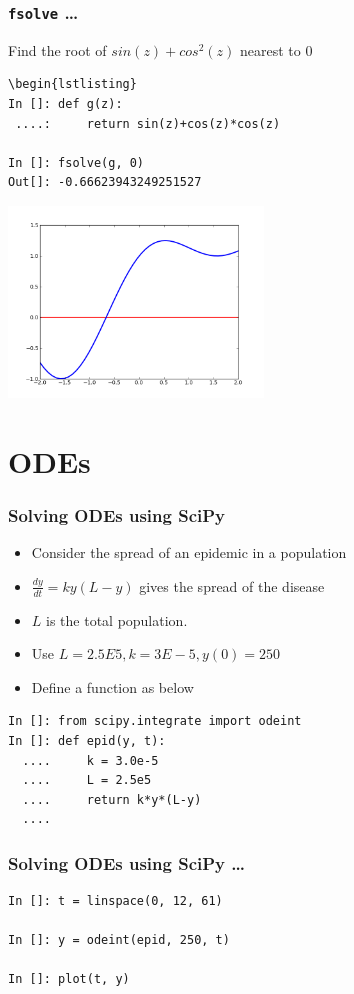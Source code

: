 \begin{frame}[fragile]
\frametitle{\texttt{fsolve} \ldots}
Find the root of $sin(z)+cos^2(z)$ nearest to $0$
\begin{lstlisting}
\begin{lstlisting}
In []: def g(z):
 ....:     return sin(z)+cos(z)*cos(z)

In []: fsolve(g, 0)
Out[]: -0.66623943249251527
\end{lstlisting}
\begin{center}
\includegraphics[height=2in, interpolate=true]{images/fsolve}    
\end{center}
\end{frame}

\section{ODEs}

\begin{frame}[fragile]
\frametitle{Solving ODEs using SciPy}
\begin{itemize}
\item Consider the spread of an epidemic in a population
\item $\frac{dy}{dt} = ky(L-y)$ gives the spread of the disease
\item $L$ is the total population.
\item Use $L = 2.5E5, k = 3E-5, y(0) = 250$
\item Define a function as below
\end{itemize}
\begin{lstlisting}
In []: from scipy.integrate import odeint
In []: def epid(y, t):
  ....     k = 3.0e-5
  ....     L = 2.5e5
  ....     return k*y*(L-y)
  ....
\end{lstlisting}
\end{frame}

\begin{frame}[fragile]
\frametitle{Solving ODEs using SciPy \ldots}
\begin{lstlisting}
In []: t = linspace(0, 12, 61)

In []: y = odeint(epid, 250, t)

In []: plot(t, y)
\end{lstlisting}
\end{frame}

